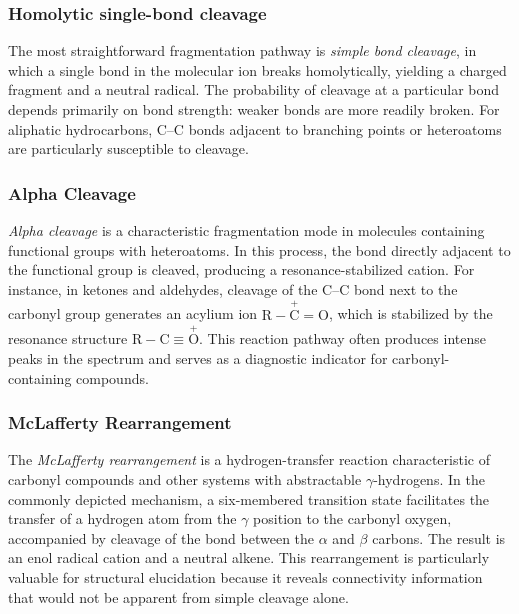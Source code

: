 \subsubsection{Homolytic single-bond cleavage}

The most straightforward fragmentation pathway is \emph{simple bond cleavage}, in which a single bond in the molecular ion breaks homolytically, yielding a charged fragment and a neutral radical.
The probability of cleavage at a particular bond depends primarily on bond strength: weaker bonds are more readily broken. \cite[p.~30]{Gross2006}
For aliphatic hydrocarbons, C--C bonds adjacent to branching points or heteroatoms are particularly susceptible to cleavage. \cite[p.~258]{Gross2006}

\subsubsection{Alpha Cleavage}

\emph{Alpha cleavage} is a characteristic fragmentation mode in molecules containing functional groups with heteroatoms. \cite[pp.~220--221]{Dass2007}
In this process, the bond directly adjacent to the functional group is cleaved, producing a resonance-stabilized cation. \cite[pp.~220--221]{Dass2007}
For instance, in ketones and aldehydes, cleavage of the C--C bond next to the carbonyl group generates an acylium ion $\mathrm{R{-}\overset{+}{C}{=}O}$, which is stabilized by the resonance structure $\mathrm{R{-}C{\equiv}\overset{+}{O}}$. \cite[p.~230]{Gross2006}
This reaction pathway often produces intense peaks in the spectrum and serves as a diagnostic indicator for carbonyl-containing compounds. \cite[pp.~234--235]{Gross2006}

\subsubsection{McLafferty Rearrangement}

The \emph{McLafferty rearrangement} is a hydrogen-transfer reaction characteristic of carbonyl compounds and other systems with abstractable $\gamma$-hydrogens.\cite[p.~223]{Dass2007}
In the commonly depicted mechanism, a six-membered transition state facilitates the transfer of a hydrogen atom from the $\gamma$ position to the carbonyl oxygen, accompanied by cleavage of the bond between the $\alpha$ and $\beta$ carbons. \cite[p.~265]{Gross2006}
The result is an enol radical cation and a neutral alkene. \cite[p.~224]{Dass2007}
This rearrangement is particularly valuable for structural elucidation because it reveals connectivity information that would not be apparent from simple cleavage alone.
\cite[p.~224]{Dass2007}

